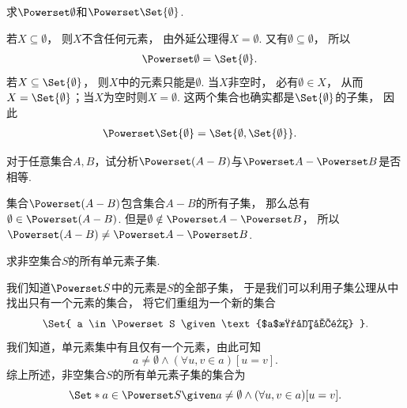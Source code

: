 \begin{example}
    求\(\Powerset\emptyset\)和\(\Powerset\Set{\emptyset}\).
    \begin{solution}
        若\(X\subseteq\emptyset\)，
        则\(X\)不含任何元素，
        由外延公理得\(X=\emptyset\).
        又有\(\emptyset\subseteq\emptyset\)，
        所以
        \begin{align*}
            \Powerset\emptyset &= \Set{\emptyset}.
        \end{align*}
        若\(X\subseteq\Set{\emptyset}\)，
        则\(X\)中的元素只能是\(\emptyset\).
        当\(X\)非空时，
        必有\(\emptyset\in X\)，
        从而\(X=\Set{\emptyset}\)；当\(X\)为空时则\(X=\emptyset\).
        这两个集合也确实都是\(\Set{\emptyset}\)的子集，
        因此
        \begin{align*}
            \Powerset\Set{\emptyset} &= \Set{\emptyset,\Set{\emptyset}}.
        \end{align*}
    \end{solution}
\end{example}

\begin{example}
对于任意集合\(A,B\)，试分析\(\Powerset(A-B)\)与\(\Powerset A - \Powerset B\)是否相等.
\begin{solution}
集合\(\Powerset(A-B)\)包含集合\(A-B\)的所有子集，
那么总有\(\emptyset\in\Powerset(A-B)\).
但是\(\emptyset\notin\Powerset A - \Powerset B\)，
所以\(\Powerset(A-B) \neq \Powerset A - \Powerset B\).
\end{solution}
\end{example}

\begin{example}
求非空集合\(S\)的所有单元素子集.
\begin{solution}
我们知道\(\Powerset S\)中的元素是\(S\)的全部子集，
于是我们可以利用子集公理从中找出只有一个元素的集合，
将它们重组为一个新的集合\begin{equation*}
	\Set{ a \in \Powerset S \given \text{$a$是单元集} }.
\end{equation*}
我们知道，单元素集中有且仅有一个元素，由此可知\begin{equation*}
	a \neq \emptyset
	\land
	(\forall u,v \in a)[u = v].
\end{equation*}
综上所述，非空集合\(S\)的所有单元素子集的集合为\begin{equation*}
	\Set*{
		a \in \Powerset S
		\given
		a \neq \emptyset
		\land
		(\forall u,v \in a)[u = v]
	}.
\end{equation*}
\end{solution}
\end{example}


